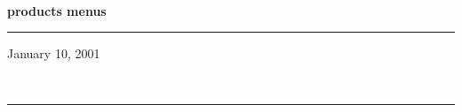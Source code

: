 \documentclass[11pt]{report}
\begin{document}
    \begin{titlepage}

        \vspace*{0.25\textheight}
        \\

\bigskip\noindent
{\Huge\bf products menus}\\
        \rule{\textwidth}{1.5mm}
        \begin{flushright}
            January 10, 2001
        \end{flushright}
        \vfill
        \\
        \rule{\textwidth}{0.75mm}
        \vspace*{0.1\textheight}

    \end{titlepage}

    \setcounter{section}{1}
    \vfil\eject
        
        \vfil\eject
        
        \vfil\eject
        
        \vfil\eject
        
        \vfil\eject
        
\end{document}
